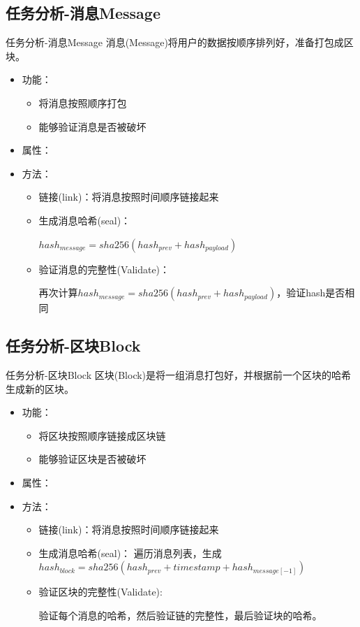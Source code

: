 \documentclass[11pt]{beamer}
\begin{document}
\subsection{任务分析-消息Message}
\begin{frame}{任务分析-消息Message}
	消息(Message)将用户的数据按顺序排列好，准备打包成区块。
	\begin{itemize}
		\item 功能：
		\begin{itemize}
			\item 将消息按照顺序打包
			\item 能够验证消息是否被破坏
		\end{itemize}
		\item 属性：
		\item 方法：
		\begin{itemize}
			\item  链接(link)：将消息按照时间顺序链接起来
			
			\item 生成消息哈希(seal)：
			
			$hash_{message}=sha256(hash_{prev} + hash_{payload})$
			
			\item 验证消息的完整性(Validate)：
			
		 再次计算$hash_{message}=sha256(hash_{prev} + hash_{payload})$，验证hash是否相同
		\end{itemize}
	\end{itemize}
\end{frame}

\subsection{任务分析-区块Block}
\begin{frame}{任务分析-区块Block}
	区块(Block)是将一组消息打包好，并根据前一个区块的哈希生成新的区块。
	\begin{itemize}
		\item 功能：
		\begin{itemize}
			\item 将区块按照顺序链接成区块链
			\item 能够验证区块是否被破坏
		\end{itemize}
		\item 属性：
		\item 方法：
		\begin{itemize}
			\item  链接(link)：将消息按照时间顺序链接起来
			\item 生成消息哈希(seal)：
			遍历消息列表，生成$hash_{block}=sha256(hash_{prev} + timestamp + hash_{message[-1]})$
			\item 验证区块的完整性(Validate):
			
			验证每个消息的哈希，然后验证链的完整性，最后验证块的哈希。
		\end{itemize}
	\end{itemize}
\end{frame}
\end{document}
